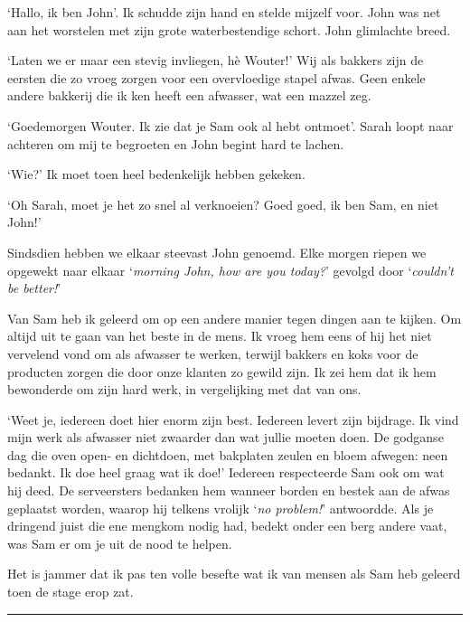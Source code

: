 \documentclass[
  11pt,
  dutch,
]{memoir}
\begin{document}
`Hallo, ik ben John'. Ik schudde zijn hand en stelde mijzelf voor. John
was net aan het worstelen met zijn grote waterbestendige schort. John
glimlachte breed.

`Laten we er maar een stevig invliegen, hè Wouter!' Wij als bakkers zijn
de eersten die zo vroeg zorgen voor een overvloedige stapel afwas. Geen
enkele andere bakkerij die ik ken heeft een afwasser, wat een mazzel
zeg.

`Goedemorgen Wouter. Ik zie dat je Sam ook al hebt ontmoet'. Sarah loopt
naar achteren om mij te begroeten en John begint hard te lachen.

`Wie?' Ik moet toen heel bedenkelijk hebben gekeken.

`Oh Sarah, moet je het zo snel al verknoeien? Goed goed, ik ben Sam, en
niet John!'

Sindsdien hebben we elkaar steevast John genoemd. Elke morgen riepen we
opgewekt naar elkaar `\emph{morning John, how are you today?}' gevolgd
door `\emph{couldn't be better!}'

Van Sam heb ik geleerd om op een andere manier tegen dingen aan te
kijken. Om altijd uit te gaan van het beste in de mens. Ik vroeg hem
eens of hij het niet vervelend vond om als afwasser te werken, terwijl
bakkers en koks voor de producten zorgen die door onze klanten zo gewild
zijn. Ik zei hem dat ik hem bewonderde om zijn hard werk, in
vergelijking met dat van ons.

`Weet je, iedereen doet hier enorm zijn best. Iedereen levert zijn
bijdrage. Ik vind mijn werk als afwasser niet zwaarder dan wat jullie
moeten doen. De godganse dag die oven open- en dichtdoen, met bakplaten
zeulen en bloem afwegen: neen bedankt. Ik doe heel graag wat ik doe!'
Iedereen respecteerde Sam ook om wat hij deed. De serveersters bedanken
hem wanneer borden en bestek aan de afwas geplaatst worden, waarop hij
telkens vrolijk `\emph{no problem!}' antwoordde. Als je dringend juist
die ene mengkom nodig had, bedekt onder een berg andere vaat, was Sam er
om je uit de nood te helpen.

Het is jammer dat ik pas ten volle besefte wat ik van mensen als Sam heb
geleerd toen de stage erop zat.

\pfbreak
\end{document}
